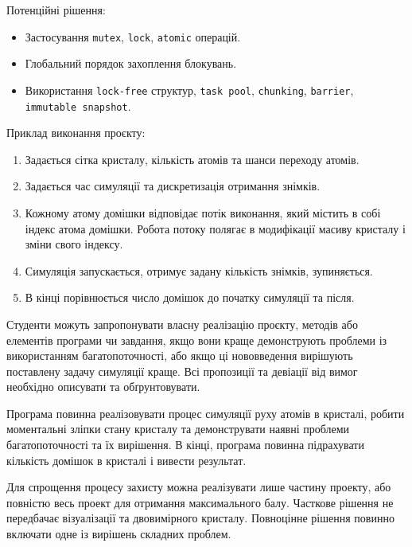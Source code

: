 \documentclass[14pt, a4paper]{extreport}
\begin{document}
	Потенційні рішення:
	
	\begin{itemize}
		\item Застосування \texttt{mutex}, \texttt{lock}, \texttt{atomic} операцій.
		
		\item Глобальний порядок захоплення блокувань.
		
		\item Використання \texttt{lock-free} структур, \texttt{task pool}, \texttt{chunking}, \texttt{barrier}, \texttt{immutable snapshot}.
	\end{itemize}
	
	Приклад виконання проєкту:
	
	\begin{enumerate}
		\item Задається сітка кристалу, кількість атомів та шанси переходу атомів.
		
		\item Задається час симуляції та дискретизація отримання знімків.
		
		\item Кожному атому домішки відповідає потік виконання, який містить в собі індекс атома домішки. Робота потоку полягає в модифікації масиву кристалу і зміни свого індексу.
		
		\item Симуляція запускається, отримує задану кількість знімків, зупиняється.
		
		\item В кінці порівнюється число домішок до початку симуляції та після.
	\end{enumerate}
	
	Студенти можуть запропонувати власну реалізацію проєкту, методів або елементів програми чи завдання, якщо вони краще демонструють проблеми із використанням багатопоточності, або якщо ці нововведення вирішують поставлену задачу симуляції краще. Всі пропозиції та девіації від вимог необхідно описувати та обґрунтовувати.
	
	Програма повинна реалізовувати процес симуляції руху атомів в кристалі, робити моментальні зліпки стану кристалу та демонструвати наявні проблеми багатопоточності та їх вирішення. В кінці, програма повинна підрахувати кількість домішок в кристалі і вивести результат.
	
	Для спрощення процесу захисту можна реалізувати лише частину проекту, або повністю весь проект для отримання максимального балу. Часткове рішення не передбачає візуалізації та двовимірного кристалу. Повноцінне рішення повинно включати одне із вирішень складних проблем.
	
\end{document}
